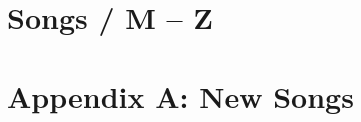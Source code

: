 \documentclass[11pt,a4paper]{book}
\begin{document}
\nolinenumbers

\chapter{Songs / M -- Z} %
\label{cha:songs_m_z}
\minitoc
\Large
\linenumbers




\nolinenumbers

\chapter{Appendix A: New Songs} %
\label{prt:appendix_a_new_songs}
\minitoc
\Large
\linenumbers
% 
% 
% 
% 
% 
% 
% 

\nolinenumbers
\end{document}
